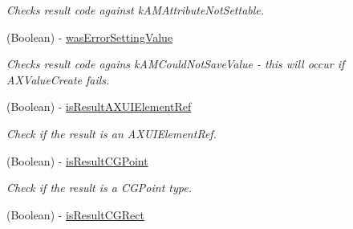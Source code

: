 \begin{DoxyCompactItemize}
\begin{DoxyCompactList}\small\item\em Checks result code against kAMAttributeNotSettable. \item\end{DoxyCompactList}\item 
\hypertarget{interface_g_d_accessibility_operation_result_ae8777c07b4dd0d20769af98ffdc1be82}{
(Boolean) -\/ \hyperlink{interface_g_d_accessibility_operation_result_ae8777c07b4dd0d20769af98ffdc1be82}{wasErrorSettingValue}}
\label{interface_g_d_accessibility_operation_result_ae8777c07b4dd0d20769af98ffdc1be82}

\begin{DoxyCompactList}\small\item\em Checks result code agains kAMCouldNotSaveValue -\/ this will occur if AXValueCreate fails. \item\end{DoxyCompactList}\item 
\hypertarget{interface_g_d_accessibility_operation_result_ac6e49f59d8c13ed8fa83bc5ae384a892}{
(Boolean) -\/ \hyperlink{interface_g_d_accessibility_operation_result_ac6e49f59d8c13ed8fa83bc5ae384a892}{isResultAXUIElementRef}}
\label{interface_g_d_accessibility_operation_result_ac6e49f59d8c13ed8fa83bc5ae384a892}

\begin{DoxyCompactList}\small\item\em Check if the result is an AXUIElementRef. \item\end{DoxyCompactList}\item 
\hypertarget{interface_g_d_accessibility_operation_result_aa358f07359c59f67e6e08f3248e92c68}{
(Boolean) -\/ \hyperlink{interface_g_d_accessibility_operation_result_aa358f07359c59f67e6e08f3248e92c68}{isResultCGPoint}}
\label{interface_g_d_accessibility_operation_result_aa358f07359c59f67e6e08f3248e92c68}

\begin{DoxyCompactList}\small\item\em Check if the result is a CGPoint type. \item\end{DoxyCompactList}\item 
\hypertarget{interface_g_d_accessibility_operation_result_a28c1642493e6d999fc2997c4ceda54e5}{
(Boolean) -\/ \hyperlink{interface_g_d_accessibility_operation_result_a28c1642493e6d999fc2997c4ceda54e5}{isResultCGRect}}
\label{interface_g_d_accessibility_operation_result_a28c1642493e6d999fc2997c4ceda54e5}


\end{DoxyCompactItemize}
